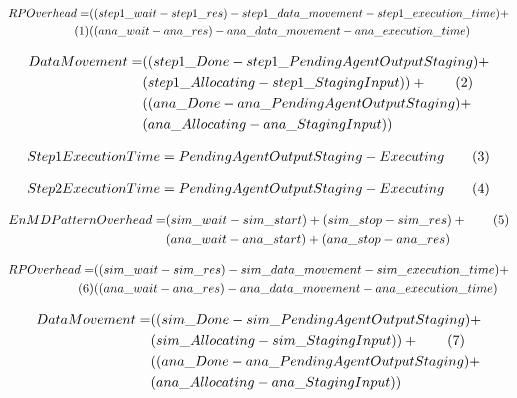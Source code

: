 \documentclass[]{article}
\newcommand\numberthis{\addtocounter{equation}{1}\tag{\theequation}}
\begin{document}
			\begin{align*}
				RP Overhead = &((step1\_wait - step1\_res) - step1\_data\_movement - step1\_execution\_time) + \\ \numberthis \label{3} 
							  &((ana\_wait - ana\_res) - ana\_data\_movement - ana\_execution\_time) 
			\end{align*}

			\begin{align*}
				Data Movement = &((step1\_Done - step1\_PendingAgentOutputStaging) + \\
								&(step1\_Allocating - step1\_StagingInput)) + \numberthis \label{4} \\
								&((ana\_Done - ana\_PendingAgentOutputStaging) + \\
								&(ana\_Allocating - ana\_StagingInput)) 
			\end{align*}
			
			\begin{align*}
				Step 1 Execution Time = PendingAgentOutputStaging - Executing \numberthis \label{5}
			\end{align*}

			\begin{align*}
				Step 2 Execution Time = PendingAgentOutputStaging - Executing \numberthis \label{6}
			\end{align*}

			\begin{align*}
				EnMD Pattern Overhead = &(sim\_wait-sim\_start) + (sim\_stop - sim\_res) + \numberthis \label{7} \\
										&(ana\_wait-ana\_start) + (ana\_stop - ana\_res) 
			\end{align*}

			\begin{align*}
				RP Overhead = &((sim\_wait - sim\_res) - sim\_data\_movement - sim\_execution\_time) + \\ \numberthis \label{8} 
							  &((ana\_wait - ana\_res) - ana\_data\_movement - ana\_execution\_time) 
			\end{align*}

			\begin{align*}
				Data Movement = &((sim\_Done - sim\_PendingAgentOutputStaging) + \\
								&(sim\_Allocating - sim\_StagingInput)) + \numberthis \label{9} \\
								&((ana\_Done - ana\_PendingAgentOutputStaging) + \\
								&(ana\_Allocating - ana\_StagingInput)) 
			\end{align*}
			
\end{document}
